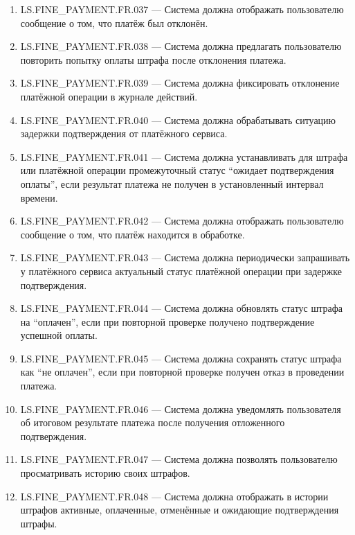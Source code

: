 \documentclass[12pt,a4paper]{article}
\begin{document}
\begin{enumerate}
		\item LS.FINE\_PAYMENT.FR.037 --- Система должна отображать пользователю сообщение о том,
		что платёж был отклонён.
		
		\item LS.FINE\_PAYMENT.FR.038 --- Система должна предлагать пользователю повторить попытку
		оплаты штрафа после отклонения платежа.
		
		\item LS.FINE\_PAYMENT.FR.039 --- Система должна фиксировать отклонение платёжной операции
		в журнале действий.
		
		\item LS.FINE\_PAYMENT.FR.040 --- Система должна обрабатывать ситуацию задержки подтверждения
		от платёжного сервиса.
		
		\item LS.FINE\_PAYMENT.FR.041 --- Система должна устанавливать для штрафа или платёжной
		операции промежуточный статус ``ожидает подтверждения оплаты'', если результат
		платежа не получен в установленный интервал времени.
		
		\item LS.FINE\_PAYMENT.FR.042 --- Система должна отображать пользователю сообщение о том,
		что платёж находится в обработке.
		
		\item LS.FINE\_PAYMENT.FR.043 --- Система должна периодически запрашивать у платёжного
		сервиса актуальный статус платёжной операции при задержке подтверждения.
		
		\item LS.FINE\_PAYMENT.FR.044 --- Система должна обновлять статус штрафа на ``оплачен'',
		если при повторной проверке получено подтверждение успешной оплаты.
		
		\item LS.FINE\_PAYMENT.FR.045 --- Система должна сохранять статус штрафа как ``не оплачен'',
		если при повторной проверке получен отказ в проведении платежа.
		
		\item LS.FINE\_PAYMENT.FR.046 --- Система должна уведомлять пользователя об итоговом результате
		платежа после получения отложенного подтверждения.
		
		\item LS.FINE\_PAYMENT.FR.047 --- Система должна позволять пользователю просматривать
		историю своих штрафов.
		
		\item LS.FINE\_PAYMENT.FR.048 --- Система должна отображать в истории штрафов активные,
		оплаченные, отменённые и ожидающие подтверждения штрафы.
		

\end{enumerate}
\end{document}
